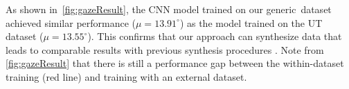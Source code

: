 As shown
in~\autoref{fig:gazeResult}, the CNN model trained on our generic~\dataset dataset achieved similar performance ($\mu\!=\!13.91^{\circ}$) as the model trained on the UT dataset \mbox{($\mu\!=\!13.55^{\circ}$)}.
This confirms that our approach can synthesize data that leads to comparable results with previous synthesis procedures \cite{sugano2014learning}.
Note from \autoref{fig:gazeResult} that there is still a performance gap between the within-dataset training (red line) and training with an external dataset.


